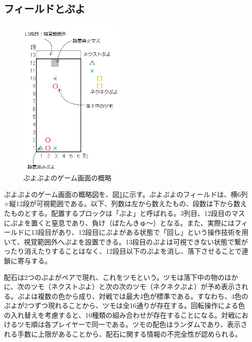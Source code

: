 \documentclass[12pt]{jreport}
\begin{document}
\subsection{フィールドとぷよ} \label{field_puyo}
\begin{figure}[tb]
  \begin{center}
  \includegraphics[height=8cm]{img/field.png}
  \caption{ぷよぷよのゲーム画面の概略} \label{fig:field}
\end{center}
\end{figure}

ぷよぷよのゲーム画面の概略図を、図\ref{fig:field}に示す。ぷよぷよのフィールドは、横6列$\times$縦12段が可視範囲である。以下、列数は左から数えたもの、段数は下から数えたものとする。配置するブロックは「ぷよ」と呼ばれる。3列目、12段目のマスにぷよを置くと窒息であり、負け（ばたんきゅ～）となる。また、実際にはフィールドに13段目があり、12段目にぷよがある状態で「回し」という操作技術を用いて、視覚範囲外へぷよを設置できる。13段目のぷよは可視できない状態で繋がったり消えたりすることはなく、12段目以下のぷよを消し、落下させることで連鎖に寄与する。

配石は2つのぷよがペアで現れ、これをツモという。ツモは落下中の物のほかに、次のツモ（ネクストぷよ）と次の次のツモ（ネクネクぷよ）が予め表示される。ぷよは複数の色から成り、対戦では最大4色が標準である。すなわち、4色のぷよが2つずつ現れることから、ツモは全16通りが存在する。回転操作による色の入れ替えを考慮すると、10種類の組み合わせが存在することになる。対戦におけるツモ順は各プレイヤーで同一である。ツモの配色はランダムであり、表示される手数に上限があることから、配石に関する情報の不完全性が認められる。
\end{document}
